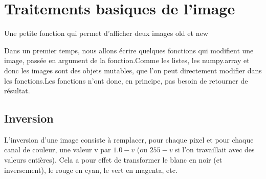 \documentclass[letterpaper,10pt,english]{jupyterBook}
\begin{document}
\section{Traitements basiques de l’image}
\label{\detokenize{notebooks/images/TRAITEMENT-DES-IMAGES:traitements-basiques-de-limage}}
\sphinxAtStartPar
Une petite fonction qui permet d’afficher deux images old et new
\begin{sphinxVerbatimInput}

\begin{sphinxVerbatim}[commandchars=\\\{\}]
 
\end{sphinxVerbatim}
\end{sphinxVerbatimInput}

\sphinxAtStartPar
Dans un premier temps, nous allons écrire quelques fonctions qui modifient une image, passée en argument de la fonction.Comme les listes, les numpy.array et donc les images sont des objets mutables, que l’on peut directement  modifier dans les fonctions.Les fonctions n’ont donc, en principe, pas besoin de retourner de résultat.


\subsection{Inversion}
\label{\detokenize{notebooks/images/TRAITEMENT-DES-IMAGES:inversion}}
\sphinxAtStartPar
L’inversion d’une image consiste à remplacer, pour chaque pixel et pour chaque canal de couleur, une valeur v par \(1.0 − v\) (ou \(255 − v\) si l’on travaillait avec des valeurs entières).
Cela a pour effet de transformer le blanc en noir (et inversement), le rouge en cyan, le vert  en magenta, etc.
\end{document}
